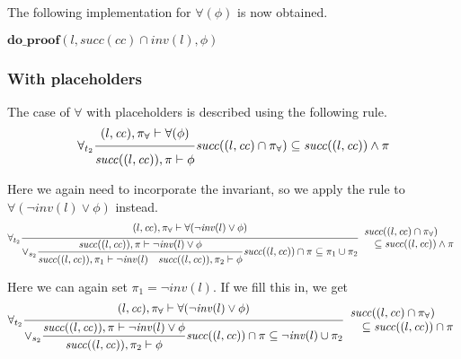 \documentclass{article}
\newcommand{\proofrule}[3][]{#1 \frac{\raisebox{.7ex}{\normalsize{$#2$}}}
  {\raisebox{-1.0ex}{\normalsize{$#3$}}}}
\newcommand{\placeholder}[1][]{\pi_{#1}}
\newcommand{\loc}{l}
\newcommand{\region}{\mathit{cc}}
\newcommand{\suc}{\mathit{succ}}
\newcommand{\inv}{\mathit{inv}}
\newcommand{\method}[1]{\ensuremath{\mathbf{#1}}}
\begin{document}
The following implementation for $\forall(\phi)$ is now obtained.
\begin{algorithm}[H]
\caption{$\method{do\_proof\_forall}(\loc, \region, \forall(\phi))$}
\begin{algorithmic}
\RETURN $\method{do\_proof}(\loc, \suc(\region) \cap \inv(\loc), \phi)$
\end{algorithmic}
\end{algorithm}

\subsubsection{With placeholders}
The case of $\forall$ with placeholders is described using the following rule.
\[
\proofrule[\forall_{t_2}]
{(\loc, \region), \placeholder[\forall] \vdash \forall(\phi)}
{\suc((\loc, \region)), \placeholder \vdash \phi}
\suc((\loc, \region) \cap \placeholder[\forall]) \subseteq \suc((\loc, \region)) \land \placeholder
\]

Here we again need to incorporate the invariant, so we apply the rule
to $\forall(\lnot \inv(\loc) \lor \phi)$ instead.
\[
\proofrule[\forall_{t_2}]
{(\loc, \region), \placeholder[\forall] \vdash \forall(\lnot \inv(\loc) \lor \phi)}
{
  \proofrule[\lor_{s_2}]
  {\suc((\loc, \region)), \placeholder \vdash \lnot \inv(\loc) \lor  \phi}
  {\suc((\loc, \region)), \placeholder[1] \vdash \lnot \inv(\loc)
    \quad \suc((\loc, \region)), \placeholder[2] \vdash \phi}
    \suc((\loc, \region)) \cap \placeholder \subseteq \placeholder[1] \cup \placeholder[2]
}
\begin{array}{l}
\suc((\loc, \region) \cap \placeholder[\forall])\\
\quad \subseteq \suc((\loc, \region)) \land \placeholder
\end{array}
\]

Here we can again set $\placeholder[1] = \lnot \inv(\loc)$. If we fill this in, we get
\[
\proofrule[\forall_{t_2}]
{(\loc, \region), \placeholder[\forall] \vdash \forall(\lnot \inv(\loc) \lor \phi)}
{
  \proofrule[\lor_{s_2}]
  {\suc((\loc, \region)), \placeholder \vdash \lnot \inv(\loc) \lor  \phi}
  {\suc((\loc, \region)), \placeholder[2] \vdash \phi}
    \suc((\loc, \region)) \cap \placeholder \subseteq \lnot \inv(\loc) \cup \placeholder[2]
}
\begin{array}{l}
\suc((\loc, \region) \cap \placeholder[\forall])\\
\quad \subseteq \suc((\loc, \region)) \cap \placeholder
\end{array}
\]
\end{document}
